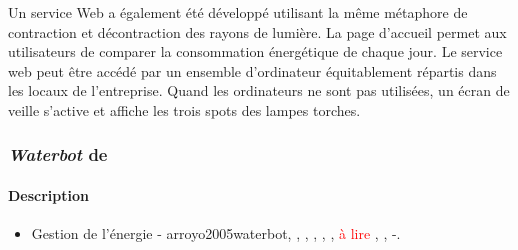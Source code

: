 \documentclass[10pt,a5paper,twoside]{article}
\begin{document}
Un service Web a également été développé utilisant la même métaphore de
contraction et décontraction des rayons de lumière. La page d'accueil
permet aux utilisateurs de comparer la consommation énergétique de
chaque jour. Le service web peut être accédé par un ensemble
d'ordinateur équitablement répartis dans les locaux de l'entreprise.
Quand les ordinateurs ne sont pas utilisées, un écran de veille s'active
et affiche les trois spots des lampes torches.

\subsubsection{\emph{Waterbot} de
\citet{arroyo2005waterbot}}\label{waterbot-de-arroyo2005waterbot}

\paragraph{Description}\label{description-11}

\begin{itemize}
\itemsep1pt\parskip0pt
\item
  Gestion de l'énergie - arroyo2005waterbot, \citet{kyoto2005wattson},
  \citet{jonsson2010watt}, \citet{ernevi2005energy},
  \citet{gyllensward2006visualizing},
  \citet{lagerkvist2016disappearing}, \textcolor{red}{à lire}
  \citet{rogers2010ambient}, \citet{kuznetsov2010upstream},
  \citet{valkanova2013reveal} -.
\end{itemize}

\newpage


\end{document}
